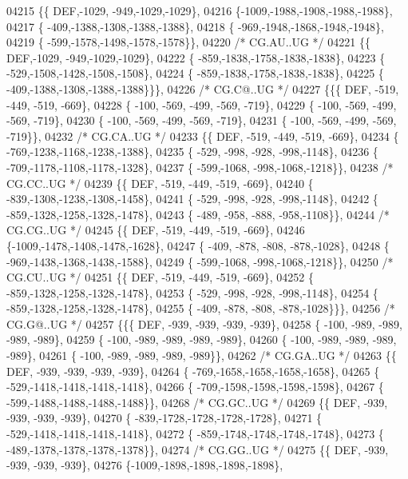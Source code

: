 \begin{DoxyCode}
04215 \{\{  DEF,-1029, -949,-1029,-1029\},
04216 \{-1009,-1988,-1908,-1988,-1988\},
04217 \{ -409,-1388,-1308,-1388,-1388\},
04218 \{ -969,-1948,-1868,-1948,-1948\},
04219 \{ -599,-1578,-1498,-1578,-1578\}\},
04220 \textcolor{comment}{/* CG.AU..UG */}
04221 \{\{  DEF,-1029, -949,-1029,-1029\},
04222 \{ -859,-1838,-1758,-1838,-1838\},
04223 \{ -529,-1508,-1428,-1508,-1508\},
04224 \{ -859,-1838,-1758,-1838,-1838\},
04225 \{ -409,-1388,-1308,-1388,-1388\}\}\},
04226 \textcolor{comment}{/* CG.C@..UG */}
04227 \{\{\{  DEF, -519, -449, -519, -669\},
04228 \{ -100, -569, -499, -569, -719\},
04229 \{ -100, -569, -499, -569, -719\},
04230 \{ -100, -569, -499, -569, -719\},
04231 \{ -100, -569, -499, -569, -719\}\},
04232 \textcolor{comment}{/* CG.CA..UG */}
04233 \{\{  DEF, -519, -449, -519, -669\},
04234 \{ -769,-1238,-1168,-1238,-1388\},
04235 \{ -529, -998, -928, -998,-1148\},
04236 \{ -709,-1178,-1108,-1178,-1328\},
04237 \{ -599,-1068, -998,-1068,-1218\}\},
04238 \textcolor{comment}{/* CG.CC..UG */}
04239 \{\{  DEF, -519, -449, -519, -669\},
04240 \{ -839,-1308,-1238,-1308,-1458\},
04241 \{ -529, -998, -928, -998,-1148\},
04242 \{ -859,-1328,-1258,-1328,-1478\},
04243 \{ -489, -958, -888, -958,-1108\}\},
04244 \textcolor{comment}{/* CG.CG..UG */}
04245 \{\{  DEF, -519, -449, -519, -669\},
04246 \{-1009,-1478,-1408,-1478,-1628\},
04247 \{ -409, -878, -808, -878,-1028\},
04248 \{ -969,-1438,-1368,-1438,-1588\},
04249 \{ -599,-1068, -998,-1068,-1218\}\},
04250 \textcolor{comment}{/* CG.CU..UG */}
04251 \{\{  DEF, -519, -449, -519, -669\},
04252 \{ -859,-1328,-1258,-1328,-1478\},
04253 \{ -529, -998, -928, -998,-1148\},
04254 \{ -859,-1328,-1258,-1328,-1478\},
04255 \{ -409, -878, -808, -878,-1028\}\}\},
04256 \textcolor{comment}{/* CG.G@..UG */}
04257 \{\{\{  DEF, -939, -939, -939, -939\},
04258 \{ -100, -989, -989, -989, -989\},
04259 \{ -100, -989, -989, -989, -989\},
04260 \{ -100, -989, -989, -989, -989\},
04261 \{ -100, -989, -989, -989, -989\}\},
04262 \textcolor{comment}{/* CG.GA..UG */}
04263 \{\{  DEF, -939, -939, -939, -939\},
04264 \{ -769,-1658,-1658,-1658,-1658\},
04265 \{ -529,-1418,-1418,-1418,-1418\},
04266 \{ -709,-1598,-1598,-1598,-1598\},
04267 \{ -599,-1488,-1488,-1488,-1488\}\},
04268 \textcolor{comment}{/* CG.GC..UG */}
04269 \{\{  DEF, -939, -939, -939, -939\},
04270 \{ -839,-1728,-1728,-1728,-1728\},
04271 \{ -529,-1418,-1418,-1418,-1418\},
04272 \{ -859,-1748,-1748,-1748,-1748\},
04273 \{ -489,-1378,-1378,-1378,-1378\}\},
04274 \textcolor{comment}{/* CG.GG..UG */}
04275 \{\{  DEF, -939, -939, -939, -939\},
04276 \{-1009,-1898,-1898,-1898,-1898\},

\end{DoxyCode}
